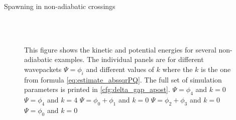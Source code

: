 \begin{chapter}{Spawning in non-adiabatic crossings}
\begin{figure}[h!]
{  } \\
   \\
  \caption[The kinetic and potential energies for several non-adiabatic examples]{
  This figure shows the kinetic and potential energies for several non-adiabatic examples.
  The individual panels are for different wavepackets $\Psi = \phi_i$ and different
  values of $k$ where the $k$ is the one from formula \eqref{eq:estimate_abssqrPQ}.
  The full set of simulation parameters is printed in \ref{cfg:delta_gap_apost}.
   $\Psi = \phi_4$ and $k=0$
   $\Psi = \phi_4$ and $k=4$
   $\Psi = \phi_0 + \phi_1$ and $k=0$
   $\Psi = \phi_2 + \phi_3$ and $k=0$
   $\Psi = \phi_0$ and $k=0$
  \label{fig:spawn_delta_gap_energies2}
  }
\end{figure}




\end{chapter}
